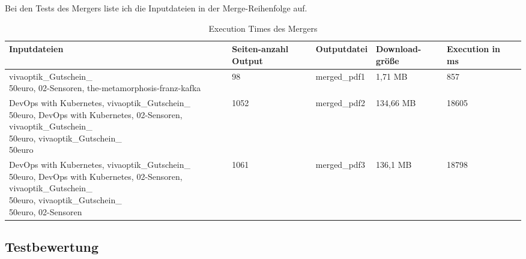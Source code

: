 Bei den Tests des Mergers liste ich die Inputdateien in der Merge-Reihenfolge auf.

\begin{table}[!htbp]
	\centering
	\begin{tabular}{|p{4cm}|p{1.7cm}|p{2.3cm}|p{2cm}|p{2cm}|p{2cm}|}
		\hline
		\textbf{Inputdateien}	& \textbf{Seiten-anzahl Output}		& \textbf{Outputdatei}		& \textbf{Download-größe}	& \textbf{Execution in ms} 	\\ 
		\hline
		\parbox[t]{4cm}{vivaoptik\_Gutschein\_\\50euro}, 02-Sensoren, the-metamorphosis-franz-kafka	& 98 & merged\_pdf1 & 1,71 MB		& 857  					\\
		DevOps with Kubernetes, \parbox[t]{4cm}{vivaoptik\_Gutschein\_\\50euro}, DevOps with Kubernetes, 02-Sensoren, \parbox[t]{4cm}{vivaoptik\_Gutschein\_\\50euro}, \parbox[t]{4cm}{vivaoptik\_Gutschein\_\\50euro}		& 1052 		& merged\_pdf2		& 134,66 MB		& 18605  						\\
		DevOps with Kubernetes, \parbox[t]{4cm}{vivaoptik\_Gutschein\_\\50euro}, DevOps with Kubernetes, 02-Sensoren, \parbox[t]{4cm}{vivaoptik\_Gutschein\_\\50euro}, \parbox[t]{4cm}{vivaoptik\_Gutschein\_\\50euro}, 02-Sensoren		& 1061 		& merged\_pdf3				& 136,1 MB					& 18798  						\\
		\hline
	\end{tabular}
	\caption{Execution Times des Mergers}
	\label{table:merger-dur}
\end{table}

\subsection{Testbewertung}